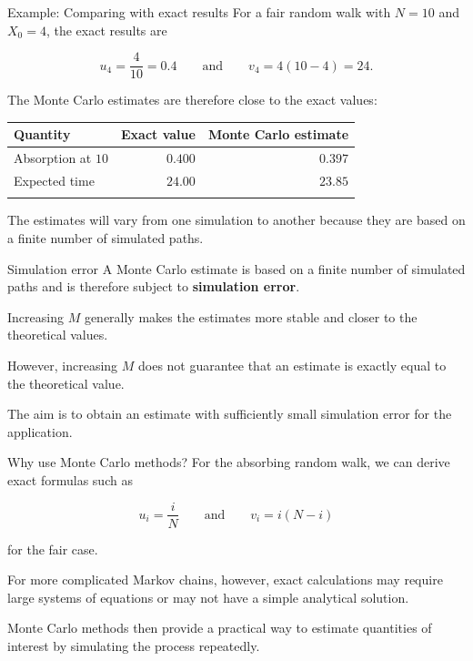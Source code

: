\documentclass[
  ignorenonframetext,
  aspectratio=169,
]{beamer}
\newcounter{none} %
\begin{document}
\begin{frame}{Example: Comparing with exact results}
\protect{}\label{example-comparing-with-exact-results}
For a fair random walk with \(N=10\) and \(X_0=4\), the exact results
are

\[
u_4=\frac4{10}=0.4
\qquad\text{and}\qquad
v_4=4(10-4)=24.
\]

The Monte Carlo estimates are therefore close to the exact values:

{\def\LTcaptype{none} %
\begin{longtable}[]{@{}lrr@{}}
\toprule\noalign{}
Quantity & Exact value & Monte Carlo estimate \\
\midrule\noalign{}
\endhead
Absorption at \(10\) & \(0.400\) & \(0.397\) \\
Expected time & \(24.00\) & \(23.85\) \\
\bottomrule\noalign{}
\end{longtable}
}

The estimates will vary from one simulation to another because they are
based on a finite number of simulated paths.
\end{frame}

\begin{frame}{Simulation error}
\protect{}\label{simulation-error}
A Monte Carlo estimate is based on a finite number of simulated paths
and is therefore subject to \textbf{simulation error}.

Increasing \(M\) generally makes the estimates more stable and closer to
the theoretical values.

However, increasing \(M\) does not guarantee that an estimate is exactly
equal to the theoretical value.

The aim is to obtain an estimate with sufficiently small simulation
error for the application.
\end{frame}

\begin{frame}{Why use Monte Carlo methods?}
\protect{}\label{why-use-monte-carlo-methods}
For the absorbing random walk, we can derive exact formulas such as

\[
u_i=\frac{i}{N}
\qquad\text{and}\qquad
v_i=i(N-i)
\]

for the fair case.

For more complicated Markov chains, however, exact calculations may
require large systems of equations or may not have a simple analytical
solution.

Monte Carlo methods then provide a practical way to estimate quantities
of interest by simulating the process repeatedly.
\end{frame}
\end{document}
